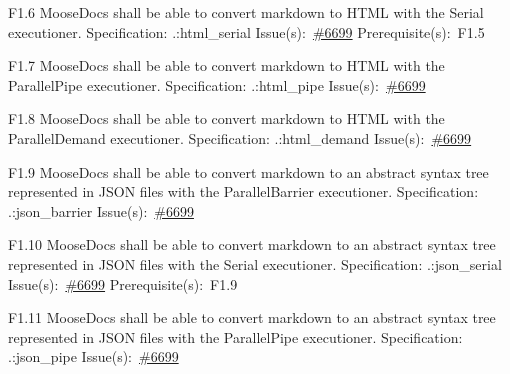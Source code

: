 \begin{Requirement}{F1.6}
MooseDocs shall be able to convert markdown to HTML with the Serial executioner.
\newline
Specification: .:html\_serial
\newline
Issue(s):~\href{https://github.com/idaholab/moose/issues/6699}{\#6699}
\newline
Prerequisite(s):~F1.5
\end{Requirement}

\begin{Requirement}{F1.7}
MooseDocs shall be able to convert markdown to HTML with the ParallelPipe executioner.
\newline
Specification: .:html\_pipe
\newline
Issue(s):~\href{https://github.com/idaholab/moose/issues/6699}{\#6699}
\end{Requirement}

\begin{Requirement}{F1.8}
MooseDocs shall be able to convert markdown to HTML with the ParallelDemand executioner.
\newline
Specification: .:html\_demand
\newline
Issue(s):~\href{https://github.com/idaholab/moose/issues/6699}{\#6699}
\end{Requirement}

\begin{Requirement}{F1.9}
MooseDocs shall be able to convert markdown to an abstract syntax tree represented in JSON files with the ParallelBarrier executioner.
\newline
Specification: .:json\_barrier
\newline
Issue(s):~\href{https://github.com/idaholab/moose/issues/6699}{\#6699}
\end{Requirement}

\begin{Requirement}{F1.10}
MooseDocs shall be able to convert markdown to an abstract syntax tree represented in JSON files with the Serial executioner.
\newline
Specification: .:json\_serial
\newline
Issue(s):~\href{https://github.com/idaholab/moose/issues/6699}{\#6699}
\newline
Prerequisite(s):~F1.9
\end{Requirement}

\begin{Requirement}{F1.11}
MooseDocs shall be able to convert markdown to an abstract syntax tree represented in JSON files with the ParallelPipe executioner.
\newline
Specification: .:json\_pipe
\newline
Issue(s):~\href{https://github.com/idaholab/moose/issues/6699}{\#6699}
\end{Requirement}

